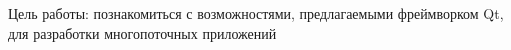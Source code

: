 

Цель работы:
познакомиться с возможностями, предлагаемыми фреймворком Qt, для разработки многопоточных приложений

